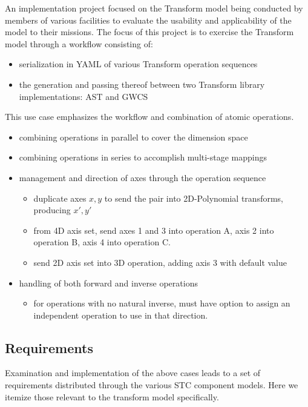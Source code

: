 \documentclass[11pt,a4paper]{ivoa}
\begin{document}
  An implementation project focused on the Transform model being conducted by members of various facilities to evaluate the usability and applicability of the model to their missions.  The focus of this project is to exercise the Transform model through a workflow consisting of:
  \begin{itemize}
    \item serialization in YAML of various Transform operation sequences
    \item the generation and passing thereof between two Transform library implementations: AST and GWCS
  \end{itemize}
  This use case emphasizes the workflow and combination of atomic operations.
  \begin{itemize}
    \item combining operations in parallel to cover the dimension space
    \item combining operations in series to accomplish multi-stage mappings
    \item management and direction of axes through the operation sequence
    \begin{itemize}
      \item duplicate axes $x,y$ to send the pair into 2D-Polynomial transforms, producing $x',y'$
      \item from 4D axis set, send axes 1 and 3 into operation A, axis 2 into operation B, axis 4 into operation C.
      \item send 2D axis set into 3D operation, adding axis 3 with default value
    \end{itemize}
    \item handling of both forward and inverse operations
    \begin{itemize}
      \item for operations with no natural inverse, must have option to assign an independent operation to use in that direction.
    \end{itemize}
  \end{itemize}


\subsection{Requirements}
\label{sect:reqs}

 Examination and implementation of the above cases leads to a set of requirements distributed through the various STC component models.  Here we 
itemize those relevant to the transform model specifically.
\end{document}
